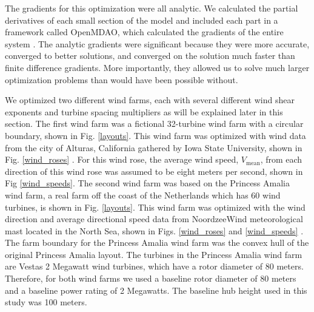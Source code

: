 \documentclass[WESD, manuscript]{copernicus}
\begin{document}
        The gradients for this optimization were all analytic. We calculated the partial derivatives of each small section of the model and included each part in a framework called OpenMDAO, which calculated the gradients of the entire system \citep{gray2010openmdao}. The analytic gradients were significant because they were more accurate, converged to better solutions, and converged on the solution much faster than finite difference gradients. More importantly, they allowed us to solve much larger optimization problems than would have been possible without. 
        
We optimized two different wind farms, each with several different wind shear exponents and turbine spacing multipliers as will be explained later in this section. 
The first wind farm was a fictional 32-turbine wind farm with a circular boundary, shown in Fig. \ref{layouts}.
This wind farm was optimized with wind data from the city of Alturas, California gathered by Iowa State University, shown in Fig. \ref{wind_roses} \citep{Alturas}. For this wind rose, the average wind speed, $V_{\text{mean}}$, from each direction of this wind rose was assumed to be eight meters per second, shown in Fig \ref{wind_speeds}.
The second wind farm was based on the Princess Amalia wind farm, a real farm off the coast of the Netherlands which has 60 wind turbines, is shown in Fig. \ref{layouts}. This wind farm was optimized with the wind direction and average directional speed data from NoordzeeWind meteorological mast located in the North Sea, shown in Figs. \ref{wind_roses} and \ref{wind_speeds} \citep{brand2012database}. The farm boundary for the Princess Amalia wind farm was the convex hull of the original Princess Amalia layout. 
The turbines in the Princess Amalia wind farm are Vestas 2 Megawatt wind turbines, which have a rotor diameter of 80 meters. Therefore, for both wind farms we used a baseline rotor diameter of 80 meters and a baseline power rating of 2 Megawatts. The baseline hub height used in this study was 100 meters. 
\end{document}
